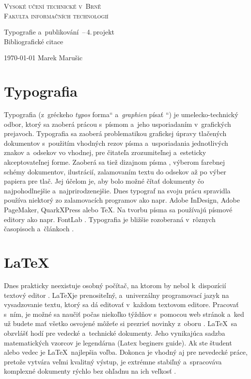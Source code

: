 \documentclass[11pt,a4paper,titlepage]{article}
\providecommand{\uv}[1]{\quotedblbase #1\textquotedblleft}
\begin{document}
\begin{titlepage}

\begin{center}
\Huge\textsc{Vysoké učení technické v~Brně \\
\huge Fakulta informačních technologií\\}

\LARGE Typografie a~publikování \,--\,4.\,projekt \\
\Huge{Bibliografické citace} \\
\end{center}
{\Large \today \hfill
Marek Marušic}
\end{titlepage}

\section{Typografia}
Typografia (z~gréckeho \emph{typos} \uv{forma} a~\emph{graphien} \uv{písať }) je umelecko-technický odbor, ktorý sa zaoberá prácou s~písmom a~jeho usporiadaním v~grafických prejavoch.
Typografia sa zaoberá problematikou grafickej úpravy tlačených dokumentov s~použitím vhodných rezov písma a~usporiadania jednotlivých znakov a~odsekov vo vhodnej, pre čitateľa zrozumiteľnej a~esteticky akceptovateľnej forme. Zaoberá sa tiež dizajnom písma \cite{TYPO:Indicka_pisma}, výberom farebnej schémy dokumentov, ilustrácií, zalamovaním textu do odsekov až po výber papiera pre tlač.
Jej účelom je, aby bolo možné čítať dokumenty čo najpohodlnejšie a~najprirodzenejšie.
Dnes typograf na svoju prácu spravidla používa niektorý zo zalamovacích programov ako napr. Adobe InDesign, Adobe PageMaker, QuarkXPress alebo TeX. Na tvorbu písma sa používajú písmové editory ako napr. FontLab \cite{Wiki:Typografia}. Typografia je bližšie rozoberaná v~rôznych časopisoch a~článkoch \cite{TYPO:Pritomna_budoucnost}.

\section{\LaTeX}
Dnes prakticky neexistuje osobný počítač, na ktorom by nebol k~dispozícií textový editor \cite{Rybicka:Latex_pro_zacatecniky}. \LaTeX je prenositeľný, a~univerzálny programovací jazyk na vysadzovanie textu, ktorý sa dá editovať v~každom textovom editore. Pracovať s~ním, je možné sa naučiť počas niekoľko týždňov s~pomocou web stránok \cite{Martinek:Latex} a~ked už budete mať všetko osvojené môžeťe si prezrieť novinky z~oboru \cite{Tex_conf:Proc}. \LaTeX\ sa obzvlášť hodí pre vedecké a~technické dokumenty. Jeho vynikajúca sadzba matematických vzorcov je legendárna (Latex beginers guide). Ak ste študent alebo vedec je \LaTeX\ najlepšia voľba. Dokonca je vhodný aj pre nevedecké práce, pretože vytvára veľmi kvalitný výstup, je extrémne stabiľný a~spracováva komplexné dokumenty rýchlo bez ohľadnu na ich veľkosť \cite{Kottwitz:LaTeX_beginner's_guide}.
\end{document}
